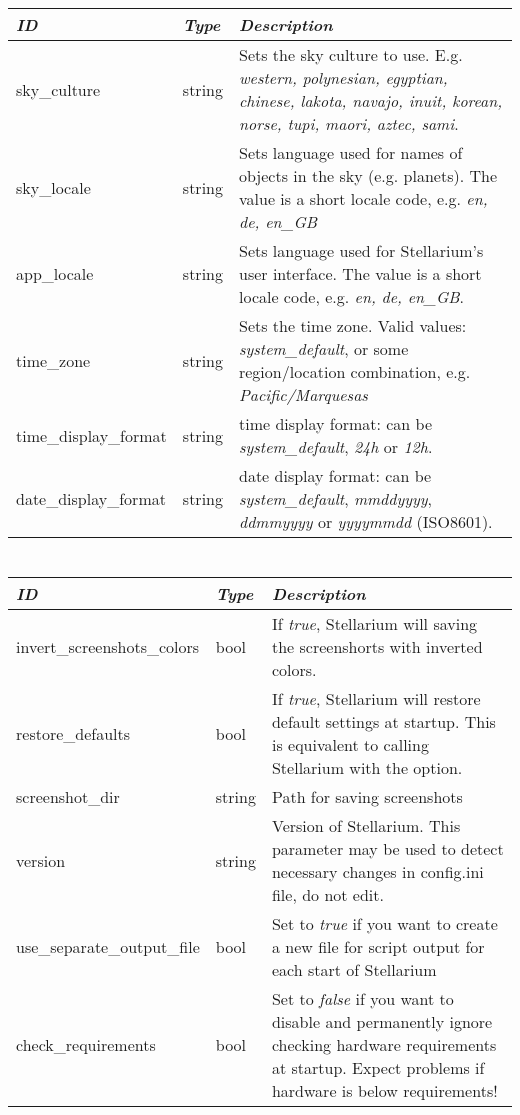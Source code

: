 \begin{longtabu} to \textwidth {l|l|X}\toprule
\emph{ID} & \emph{Type} & \emph{Description}\\\midrule
sky\_culture & string & Sets the sky culture to use. E.g. \emph{western, polynesian, egyptian, chinese, 
                        lakota, navajo, inuit, korean, norse, tupi, maori, aztec, sami}.\\\midrule
sky\_locale & string & Sets language used for names of objects in the sky (e.g. planets). 
                       The value is a short locale code, e.g. \emph{en, de, en\_GB}\\\midrule
app\_locale & string & Sets language used for Stellarium's user interface. 
                       The value is a short locale code, e.g. \emph{en, de, en\_GB}.\\\midrule
time\_zone & string  & Sets the time zone. Valid values: \emph{system\_default}, 
                       or some region/location combination, e.g. \emph{Pacific/Marquesas}\\\midrule
time\_display\_format & string & time display format: can be \emph{system\_default}, \emph{24h} or \emph{12h}.\\\midrule
date\_display\_format & string & date display format: can be \emph{system\_default}, \emph{mmddyyyy}, \emph{ddmmyyyy} or \emph{yyyymmdd} (ISO8601).\\\bottomrule
\end{longtabu}

\section{}\label{sec:config.ini:main}

\begin{longtabu} to \textwidth {l|l|X}\toprule
\emph{ID}                 & \emph{Type} & \emph{Description}\\\midrule
invert\_screenshots\_colors & bool & If \emph{true}, Stellarium will saving the screenshorts with inverted colors.\\\midrule
restore\_defaults           & bool & If \emph{true}, Stellarium will restore default settings at startup. 
                                     This is equivalent to calling Stellarium with the  option.\\\midrule
screenshot\_dir             & string & Path for saving screenshots\\\midrule
version                     & string & Version of Stellarium. This parameter may be used to detect necessary changes in config.ini file, do not edit.\\\midrule
use\_separate\_output\_file & bool   & Set to \emph{true} if you want to create a new file for script output for each start of Stellarium\\\midrule
check\_requirements         & bool   & Set to \emph{false} if you want to disable and permanently ignore checking hardware requirements at startup. 
                                       Expect problems if hardware is below requirements!\\
\bottomrule
\end{longtabu}

